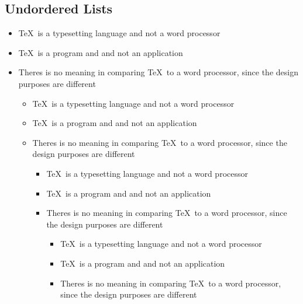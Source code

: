 \documentclass{article} %
\begin{document}
{\subsection{Undordered Lists}
\begin{itemize}
\item \TeX\ is a typesetting language and not a word processor
\item \TeX\ is a program and and not an application
\item Theres is no meaning in comparing \TeX\ to a word processor, since the design
purposes are different
\begin{itemize}
\item \TeX\ is a typesetting language and not a word processor
\item \TeX\ is a program and and not an application
\item Theres is no meaning in comparing \TeX\ to a word processor, since the design
purposes are different
\begin{itemize}
\item \TeX\ is a typesetting language and not a word processor
\item \TeX\ is a program and and not an application
\item Theres is no meaning in comparing \TeX\ to a word processor, since the design
purposes are different
\begin{itemize}
\item \TeX\ is a typesetting language and not a word processor
\item \TeX\ is a program and and not an application
\item Theres is no meaning in comparing \TeX\ to a word processor, since the design
purposes are different
\end{itemize}
\end{itemize}
\end{itemize}
\end{itemize}

}
\end{document}
